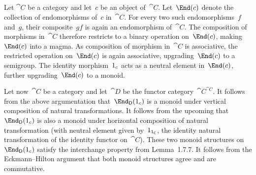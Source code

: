 \subsection{}

Let $\cat{C}$ be a category and let~$c$ be an object of~$\cat{C}$.
Let~$\End(c)$ denote the collection of endomorphisms of~$c$ in~$\cat{C}$.
For every two such endomorphisms~$f$ and~$g$, their composite~$gf$ is again an endomorphism of~$\cat{C}$.
The composition of morphisms in~$\cat{C}$ therefore restricts to a binary operation on~$\End(c)$, making~$\End(c)$ into a magma.
As composition of morphism in~$\cat{C}$ is associative, the restricted operation on~$\End(c)$ is again associative, upgrading~$\End(c)$ to a semigroup.
The identity morphism~$1_c$ acts as a neutral element in~$\End(c)$, further upgrading~$\End(c)$ to a monoid.

Let now~$\cat{C}$ be a category and let~$\cat{D}$ be the functor category~$\cat{C}^{\cat{C}}$.
It follows from the above argumentation that~$\End_{\cat{D}}(\id_c)$ is a monoid under vertical composition of natural transformations.
It follows from the upcoming  that~$\End_{\cat{D}}(\id_c)$ is also a monoid under horizontal composition of natural transformation (with neutral element given by~$1_{1_{\mathsf{C}}}$, the identity natural transformation of the identity functor on~$\cat{C}$).
These two monoid structures on~$\End_{\cat{D}}(\id_c)$ satisfy the interchange property from Lemma~1.7.7.
It follows from the Eckmann--Hilton argument that both monoid structures agree and are commutative.


